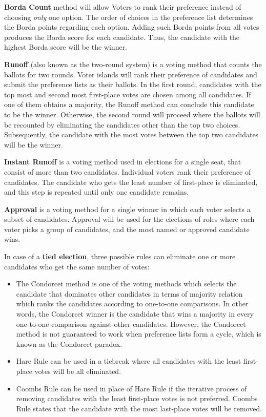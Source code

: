 \textbf{Borda Count} method will allow Voters to rank their preference instead of choosing \emph{only} one option. The order of choices in the preference list determines the Borda points regarding each option. Adding such Borda points from all votes produces the Borda score for each candidate. Thus, the candidate with the highest Borda score will be the winner.

\textbf{Runoff} (also known as the two-round system) is a voting method that counts the ballots for two rounds. Voter islands will rank their preference of candidates and submit the preference lists as their ballots. In the first round, candidates with the top most and second most first-place votes are chosen among all candidates. If one of them obtains a majority, the Runoff method can conclude this candidate to be the winner. Otherwise, the second round will proceed where the ballots will be recounted by eliminating the candidates other than the top two choices. Subsequently, the candidate with the most votes between the top two candidates will be the winner.

\textbf{Instant Runoff} is a voting method used in elections for a single seat, that consist of more than two candidates.
Individual voters rank their preference of candidates. The candidate who gets the least number of first-place is eliminated, and this step is repeated until only one candidate remains.

\textbf{Approval} is a voting method for a single winner in which each voter selects a subset of candidates. Approval will be used for the elections of roles where each voter picks a group of candidates, and the most named or approved candidate wins.

In case of a \textbf{tied election}, three possible rules can eliminate one or more candidates who get the same number of votes:
\begin{itemize}
    \item The Condorcet method is one of the voting methods which selects the candidate that dominates other candidates in terms of majority relation which ranks the candidates according to one-to-one comparisons. In other words, the Condorcet winner is the candidate that wins a majority in every one-to-one comparison against other candidates. However, the Condorcet method is not guaranteed to work when preference lists form a cycle, which is known as the Condorcet paradox.
    \item Hare Rule can be used in a tiebreak where all candidates with the least first-place votes will be all eliminated.
    \item Coombs Rule can be used in place of Hare Rule if the iterative process of removing candidates with the least first-place votes is not preferred. Coombs Rule states that the candidate with the most last-place votes will be removed.
\end{itemize}

